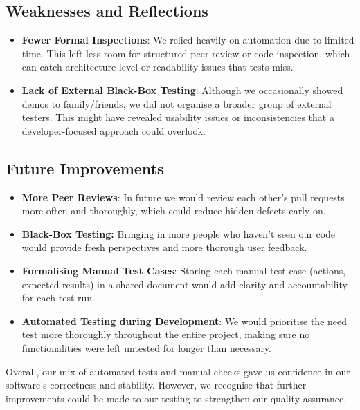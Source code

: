 \subsection{Weaknesses and Reflections} \begin{itemize} \item \textbf{Fewer Formal Inspections}: We relied heavily on automation due to limited time. This left less room for structured peer review or code inspection, which can catch architecture-level or readability issues that tests miss. \item \textbf{Lack of External Black-Box Testing}: Although we occasionally showed demos to family/friends, we did not organise a broader group of external testers. This might have revealed usability issues or inconsistencies that a developer-focused approach could overlook.\end{itemize}

\subsection{Future Improvements} \begin{itemize} \item \textbf{More Peer Reviews}: In future we would review each other’s pull requests more often and thoroughly, which could reduce hidden defects early on. \item \textbf{Black-Box Testing:} Bringing in more people who haven’t seen our code would provide fresh perspectives and more thorough user feedback. \item \textbf{Formalising Manual Test Cases}: Storing each manual test case (actions, expected results) in a shared document would add clarity and accountability for each test run.
\item \textbf{Automated Testing during Development}: We would prioritise the need test more thoroughly throughout the entire project, making sure no functionalities were left untested for longer than necessary.\end{itemize}

\noindent Overall, our mix of automated tests and manual checks gave us confidence in our software’s correctness and stability. However, we recognise that further improvements could be made to our testing to strengthen our quality assurance.
